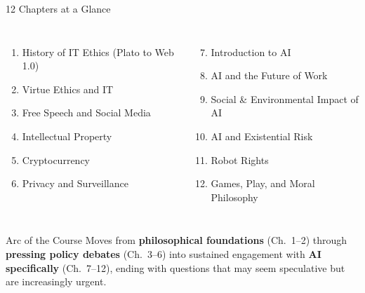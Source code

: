 \documentclass[aspectratio=169,10pt]{beamer}
\begin{document}
\begin{frame}{12 Chapters at a Glance}
\vspace{0.2em}
\begin{columns}[c]
\footnotesize
\begin{enumerate}
  \item History of IT Ethics (Plato to Web 1.0)
  \item Virtue Ethics and IT
  \item Free Speech and Social Media
  \item Intellectual Property
  \item Cryptocurrency
  \item Privacy and Surveillance
\end{enumerate}
\footnotesize
\begin{enumerate}
  \setcounter{enumi}{6}
  \item Introduction to AI
  \item AI and the Future of Work
  \item Social \& Environmental Impact of AI
  \item AI and Existential Risk
  \item Robot Rights
  \item Games, Play, and Moral Philosophy
\end{enumerate}
\end{columns}
\vspace{0.4em}
\begin{block}{Arc of the Course}
\small Moves from \textbf{philosophical foundations} (Ch.~1--2) through \textbf{pressing policy debates} (Ch.~3--6) into sustained engagement with \textbf{AI specifically} (Ch.~7--12), ending with questions that may seem speculative but are increasingly urgent.
\end{block}
\end{frame}
\end{document}
